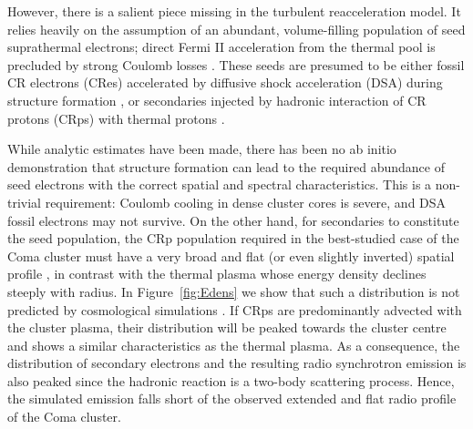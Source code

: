 \documentclass[fleqn,usenatbib,useAMS]{mnras}
\begin{document}
However, there is a salient piece missing in the turbulent
reacceleration model. It relies heavily on the assumption of an
abundant, volume-filling population of seed suprathermal electrons;
direct Fermi II acceleration from the thermal pool is precluded by
strong Coulomb losses
\citep{2008ApJ...682..175P,2012ApJ...759..113C}. These seeds are
presumed to be either fossil CR electrons (CRes) accelerated by
diffusive shock acceleration (DSA) during structure formation
\citep{1999ApJ...520..529S}, or secondaries injected by hadronic
interaction of CR protons (CRps) with thermal protons
\citep{brunetti11}.

While analytic estimates have been made, there has been no ab initio
demonstration that structure formation can lead to the required
abundance of seed electrons with the correct spatial and spectral
characteristics. This is a non-trivial requirement: Coulomb cooling in
dense cluster cores is severe, and DSA fossil electrons may not
survive. On the other hand, for secondaries to constitute the seed
population, the CRp population required in the best-studied case of
the Coma cluster must have a very broad and flat (or even slightly
inverted) spatial profile \citep{brunetti12}, in contrast with the
thermal plasma whose energy density declines steeply with radius. In
Figure~\ref{fig:Edens} we show that such a distribution is not predicted
by cosmological simulations \cite[see
  also][]{pinzke10,2014MNRAS.439.2662V}. If CRps are predominantly
advected with the cluster plasma, their distribution will be peaked
towards the cluster centre and shows a similar characteristics as the
thermal plasma. As a consequence, the distribution of secondary
electrons and the resulting radio synchrotron emission is also peaked
since the hadronic reaction is a two-body scattering process. Hence,
the simulated emission falls short of the observed extended and flat
radio profile of the Coma cluster.
\end{document}
